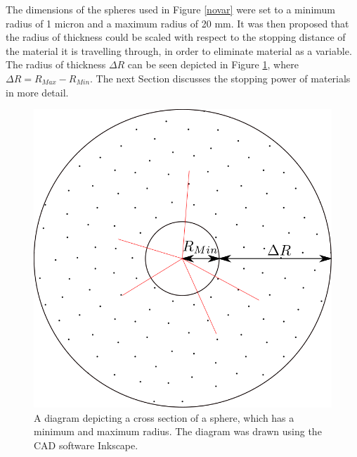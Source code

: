 \documentclass[12pt,a4paper]{article}
\begin{document}
\noindent The dimensions of the spheres used in Figure \ref{novar} were set to a minimum radius of 1 micron and a maximum radius of 20 mm. It was then proposed that the radius of thickness could be scaled with respect to the stopping distance of the material it is travelling through, in order to eliminate material as a variable. The radius of thickness $\Delta R$ can be seen depicted in Figure \ref{deltar}, where $\Delta R = R_{Max} - R_{Min}$. The next Section discusses the stopping power of materials in more detail.

\begin{figure}[h!]
\centering
\includegraphics[scale=0.2]{Images//Materials//RMAX.png}
\caption[width=\columnwidth]{A diagram depicting a cross section of a sphere, which has a minimum and maximum radius. The diagram was drawn using the CAD software Inkscape.}
\label{deltar}
\end{figure}

\newpage
\end{document}
